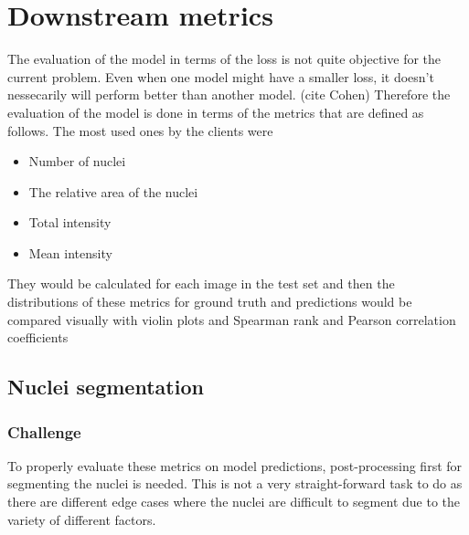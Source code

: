 \section{Downstream metrics}
The evaluation of the model in terms of the loss is not quite objective for the current problem. Even when one model might have a smaller loss, it doesn't nessecarily will perform better than another model. (cite Cohen) Therefore the evaluation of the model is done in terms of the metrics that are defined as follows. The most used ones by the clients were
\begin{itemize}
    \item Number of nuclei
    \item The relative area of the nuclei
    \item Total intensity
    \item Mean intensity
\end{itemize}

They would be calculated for each image in the test set and then the distributions of these metrics for ground truth and predictions would be compared visually with violin plots and Spearman rank and Pearson correlation coefficients

\subsection{Nuclei segmentation}
\subsubsection{Challenge}
To properly evaluate these metrics on model predictions, post-processing first for segmenting the nuclei is needed. This is not a very straight-forward task to do as there are different edge cases where the nuclei are difficult to segment due to the variety of different factors. 

